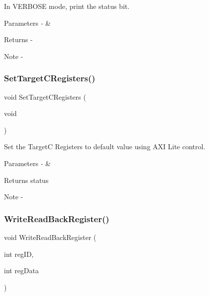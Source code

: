 In V\+E\+R\+B\+O\+SE mode, print the status bit. 


\begin{DoxyParams}{Parameters}
{\em -\/} & \\
\hline
\end{DoxyParams}
\begin{DoxyReturn}{Returns}
-\/
\end{DoxyReturn}
\begin{DoxyNote}{Note}
-\/ 
\end{DoxyNote}
\mbox{\label{_t_a_r_g_e_t_c___register_map_8h_a75c207718aac25b039f539a717bedf1c}} 
\subsubsection{SetTargetCRegisters()}
{\footnotesize\ttfamily void Set\+Target\+C\+Registers (\begin{DoxyParamCaption}\item[{void}]{ }\end{DoxyParamCaption})}



Set the TargetC Registers to default value using A\+XI Lite control. 



 
\begin{DoxyParams}{Parameters}
{\em -\/} & \\
\hline
\end{DoxyParams}
\begin{DoxyReturn}{Returns}
status
\end{DoxyReturn}
\begin{DoxyNote}{Note}
-\/ \begin{DoxyVerb}\end{DoxyVerb}
 
\end{DoxyNote}
\mbox{\label{_t_a_r_g_e_t_c___register_map_8h_adae92300a2b891ea8cc718bf2904ca74}} 
\subsubsection{WriteReadBackRegister()}
{\footnotesize\ttfamily void Write\+Read\+Back\+Register (\begin{DoxyParamCaption}\item[{int}]{reg\+ID,  }\item[{int}]{reg\+Data }\end{DoxyParamCaption})}



